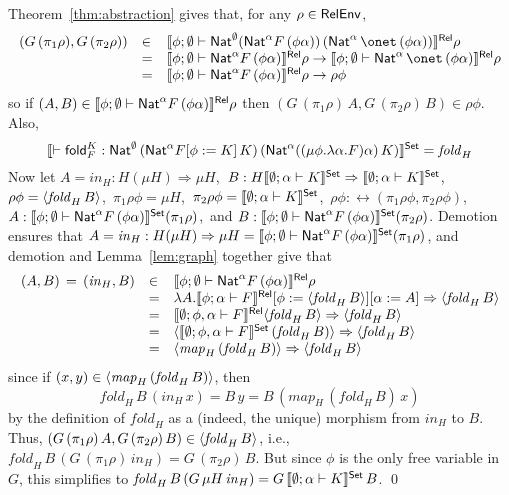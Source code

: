 \documentclass{lmcs}
\theoremstyle{plain}\newtheorem{satz}[thm]{Satz}
\newcommand{\fold}{\mathsf{fold}}
\begin{document}
{\proof
Theorem~\ref{thm:abstraction} gives that, for any 
$\rho \in \mathsf{RelEnv}$,
\[\begin{array}{lll}
(G \,(\pi_1 \rho), G\, (\pi_2 \rho)) & \in &
\relsem{\phi;\emptyset\vdash \Nat^{\emptyset} (\Nat^\alpha 
  F\, (\phi\alpha))\, (\Nat^\alpha\,\onet \, (\phi\alpha))}
\rho\\ 
& = & \relsem{\phi;\emptyset\vdash \Nat^\alpha F\,
  (\phi\alpha)}\rho \to \relsem{\phi;\emptyset\vdash
  \Nat^\alpha\,\onet \, (\phi\alpha)}\rho\\ 
& = & \relsem{\phi;\emptyset\vdash \Nat^\alpha F\,
  (\phi\alpha)}\rho \to \rho \phi
\end{array}\]
\noindent
so if $(A, B) \in \llbracket{\phi;\emptyset\vdash \mathsf{Nat}^\alpha F\,
  (\phi\alpha)}\rrbracket^{\mathsf{Rel}}\rho$ then $(G \,(\pi_1 \rho)\, A, G\, (\pi_2 \rho)\,
B) \in \rho \phi$.
Also,
\[\setsem{\vdash \fold_F^K :
  \Nat^{\emptyset}\, (\Nat^\alpha F[\phi := K]\,K)\, (\Nat^\alpha
  ((\mu \phi.\lambda\alpha.F)\alpha)\,K)} = \mathit{fold}_H\]
Now let $A = \mathit{in}_H : H (\mu H) \Rightarrow
\mu H$,\, $B : H\llbracket{\emptyset;\alpha\vdash K}\rrbracket^{\mathsf{Set}} \Rightarrow
\llbracket{\emptyset;\alpha \vdash K}\rrbracket^{\mathsf{Set}}$,\, $\rho \phi =
\langle {\mathit{fold}_H\, B} \rangle$,\, $\pi_1 \rho \phi = \mu H$,\, $\pi_2
\rho \phi = \llbracket{\emptyset;\alpha\vdash K}\rrbracket^{\mathsf{Set}}$,\, $\rho \phi :
\rel(\pi_1 \rho \phi, \pi_2 \rho \phi)$,\, $A : \llbracket{\phi;
  \emptyset \vdash \mathsf{Nat}^\alpha F \, (\phi \alpha)}\rrbracket^{\mathsf{Set}} (\pi_1 \rho)$,\,
and $B : \llbracket{\phi; \emptyset \vdash \mathsf{Nat}^\alpha F \, (\phi
  \alpha)}\rrbracket^{\mathsf{Set}} (\pi_2 \rho)$.
Demotion ensures that $A = \mathit{in}_H : H(\mu H) \Rightarrow \mu H
= \llbracket{\phi;\emptyset \vdash \mathsf{Nat}^\alpha F
  \,(\phi\alpha)}\rrbracket^{\mathsf{Set}}(\pi_1\rho)$,
and demotion and Lemma~\ref{lem:graph} together give that
\[\begin{array}{lll}
(A,B) \,=\, (\mathit{in}_H,B) & \in & \llbracket{\phi;\emptyset\vdash
  \mathsf{Nat}^\alpha F\, (\phi\alpha)}\rrbracket^{\mathsf{Rel}}\rho\\
& = & \lambda A. \llbracket{\phi;\alpha\vdash F}\rrbracket^{\mathsf{Rel}}[\phi :=
  \langle {\mathit{fold}_H\, B} \rangle][\alpha := A] \Rightarrow 
 \langle {\mathit{fold}_H\, B} \rangle \\ 
& = & \llbracket{\emptyset;\phi,\alpha\vdash F}\rrbracket^{\mathsf{Rel}}
  \langle {\mathit{fold}_H\, B} \rangle \Rightarrow \langle {\mathit{fold}_H\,
    B} \rangle\\
  & = & \langle {\llbracket{\emptyset;\phi,\alpha\vdash F}\rrbracket^{\mathsf{Set}}
    \,(\mathit{fold}_H\,B)} \rangle \Rightarrow \langle {\mathit{fold}_H\, B} \rangle\\
  & = & \langle {\mathit{map}_H \,(\mathit{fold}_H\,B)} \rangle \Rightarrow
\langle {\mathit{fold}_H\, B} \rangle\\
\end{array}\]
since if $(x,y) \in \langle {\mathit{map}_H \,(\mathit{fold}_H\,B)} \rangle$,
then $$\mathit{fold}_H\, B\, (\mathit{in}_H\,x) = B\,y = B\,
(\mathit{map}_H \,(\mathit{fold}_H\,B) \, x)$$ by the definition of
$\mathit{fold}_H$ as a (indeed, the unique) morphism from
$\mathit{in}_H$ to $B$.  Thus, $(G \,(\pi_1 \rho)\, A, G\, (\pi_2
\rho)\, B) \in \langle {\mathit{fold}_H\, B} \rangle$, i.e., $\mathit{fold}_H \,
B \, (G\, (\pi_1 \rho) \, \mathit{in}_H) = G\,(\pi_2 \rho)\,B$.  But
since $\phi$ is the only free variable in $G$, this simplifies to
$\mathit{fold}_H\, B \, (G\, \mu H\, \mathit{in}_H) =
G\,\llbracket{\emptyset;\alpha\vdash K}\rrbracket^{\mathsf{Set}}\,B$. \qed

}
\end{document}
